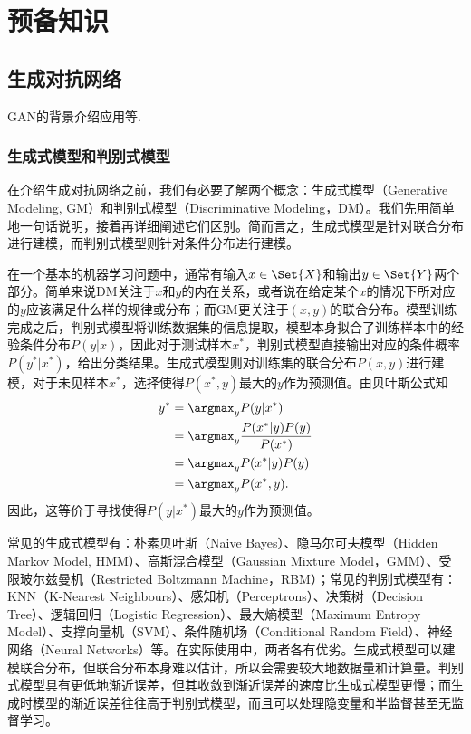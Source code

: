 \chapter{预备知识}\label{chap:preliminaries}

\section{生成对抗网络}\label{sec:gan}
GAN的背景介绍应用等.

\subsection{生成式模型和判别式模型}\label{sec:gm-dm}
在介绍生成对抗网络之前，我们有必要了解两个概念：生成式模型（Generative Modeling, GM）和判别式模型（Discriminative Modeling，DM）。我们先用简单地一句话说明，接着再详细阐述它们区别。简而言之，生成式模型是针对联合分布进行建模，而判别式模型则针对条件分布进行建模。

在一个基本的机器学习问题中，通常有输入$x \in \Set{X}$和输出$y \in \Set{Y}$两个部分。简单来说DM关注于$x$和$y$的内在关系，或者说在给定某个$x$的情况下所对应的$y$应该满足什么样的规律或分布；而GM更关注于$(x, y)$的联合分布。模型训练完成之后，判别式模型将训练数据集的信息提取，模型本身拟合了训练样本中的经验条件分布$P(y|x)$，因此对于测试样本$x^*$，判别式模型直接输出对应的条件概率$P(y^* | x^*)$，给出分类结果。生成式模型则对训练集的联合分布$P(x,y)$进行建模，对于未见样本$x^*$，选择使得$P(x^*, y)$最大的$y$作为预测值。由贝叶斯公式知
\[
  \begin{split}
    y^{*} &= \argmax_y P(y|x^{*}) \\
       &= \argmax_y \frac{P(x^*|y)P(y)}{P(x^*)} \\
       &= \argmax_y P(x^*|y)P(y) \\
       &= \argmax_y P(x^*, y).
  \end{split}
\]
因此，这等价于寻找使得$P(y|x^*)$最大的$y$作为预测值。

常见的生成式模型有：朴素贝叶斯（Naive Bayes）、隐马尔可夫模型（Hidden Markov Model, HMM）、高斯混合模型（Gaussian Mixture Model，GMM）、受限玻尔兹曼机（Restricted Boltzmann Machine，RBM）；常见的判别式模型有：KNN（K-Nearest Neighbours）、感知机（Perceptrons）、决策树（Decision Tree）、逻辑回归（Logistic Regression）、最大熵模型（Maximum Entropy Model）、支撑向量机（SVM）、条件随机场（Conditional Random Field）、神经网络（Neural Networks）等。在实际使用中，两者各有优劣。生成式模型可以建模联合分布，但联合分布本身难以估计，所以会需要较大地数据量和计算量。判别式模型具有更低地渐近误差，但其收敛到渐近误差的速度比生成式模型更慢；而生成时模型的渐近误差往往高于判别式模型\citep{ng2002discriminative}，而且可以处理隐变量和半监督甚至无监督学习。


